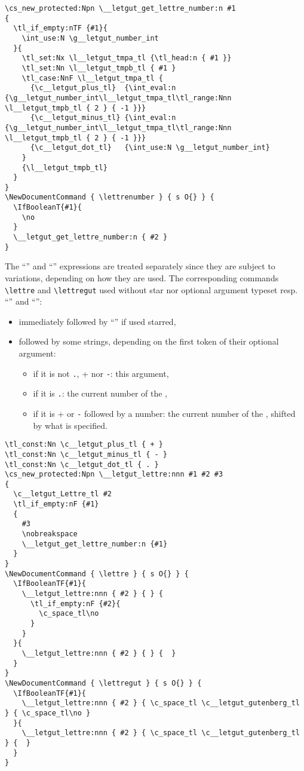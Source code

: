 \documentclass{letgut}
\begin{document}
\begin{lstlisting}
\cs_new_protected:Npn \__letgut_get_lettre_number:n #1
{
  \tl_if_empty:nTF {#1}{
    \int_use:N \g__letgut_number_int
  }{
    \tl_set:Nx \l__letgut_tmpa_tl {\tl_head:n { #1 }}
    \tl_set:Nn \l__letgut_tmpb_tl { #1 }
    \tl_case:NnF \l__letgut_tmpa_tl {
      {\c__letgut_plus_tl}  {\int_eval:n {\g__letgut_number_int\l__letgut_tmpa_tl\tl_range:Nnn \l__letgut_tmpb_tl { 2 } { -1 }}}
      {\c__letgut_minus_tl} {\int_eval:n {\g__letgut_number_int\l__letgut_tmpa_tl\tl_range:Nnn \l__letgut_tmpb_tl { 2 } { -1 }}}
      {\c__letgut_dot_tl}   {\int_use:N \g__letgut_number_int}
    }
    {\l__letgut_tmpb_tl}
  }
}
\NewDocumentCommand { \lettrenumber } { s O{} } {
  \IfBooleanT{#1}{
    \no
  }
  \__letgut_get_lettre_number:n { #2 }
}
\end{lstlisting}

The “” and “” expressions are treated separately since they are
subject to variations, depending on how they are used. The corresponding commands
\lstinline+\lettre+ and \lstinline+\lettregut+ used without star nor optional argument typeset
resp. “” and “”:

\begin{itemize}
\item immediately followed by “\no” if used starred,
\item followed by some strings, depending on the first token of their optional
argument:
\begin{itemize}
\item if it is not \lstinline+.+, \lstinline+++ nor \lstinline+-+: this argument,
\item if it is \lstinline+.+: the current number of the ,
\item if it is \lstinline+++ or \lstinline+-+ followed by a number: the current number of the ,
shifted by what is specified.
\end{itemize}
\end{itemize}

\begin{lstlisting}
\tl_const:Nn \c__letgut_plus_tl { + }
\tl_const:Nn \c__letgut_minus_tl { - }
\tl_const:Nn \c__letgut_dot_tl { . }
\cs_new_protected:Npn \__letgut_lettre:nnn #1 #2 #3
{
  \c__letgut_Lettre_tl #2
  \tl_if_empty:nF {#1}
  {
    #3
    \nobreakspace
    \__letgut_get_lettre_number:n {#1}
  }
}
\NewDocumentCommand { \lettre } { s O{} } {
  \IfBooleanTF{#1}{
    \__letgut_lettre:nnn { #2 } { } {
      \tl_if_empty:nF {#2}{
        \c_space_tl\no
      }
    }
  }{
    \__letgut_lettre:nnn { #2 } { } {  }
  }
}
\NewDocumentCommand { \lettregut } { s O{} } {
  \IfBooleanTF{#1}{
    \__letgut_lettre:nnn { #2 } { \c_space_tl \c__letgut_gutenberg_tl } { \c_space_tl\no }
  }{
    \__letgut_lettre:nnn { #2 } { \c_space_tl \c__letgut_gutenberg_tl } {  }
  }
}
\end{lstlisting}
\end{document}
